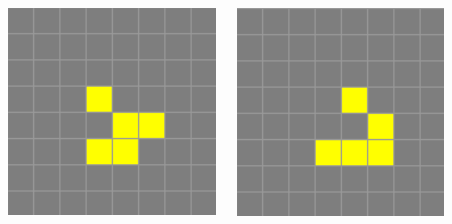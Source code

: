 \documentclass[20pt,margin=2.2cm,innermargin=-4.5in,blockverticalspace=-0.25in]{tikzposter}
\begin{document}
\begin{columns}
{\begin{minipage}[t]{\linewidth}
\begin{minipage}[t]{0.15\linewidth}
            \end{minipage}
            \begin{minipage}[t]{0.15\linewidth}
                \includegraphics[width=\textwidth]{images/life-glider-4.png}
            \end{minipage}
            \begin{minipage}[t]{0.15\linewidth}
                \includegraphics[width=\textwidth]{images/life-glider-5.png}
            \end{minipage}
        \end{minipage}

}
\end{columns}
\end{document}
